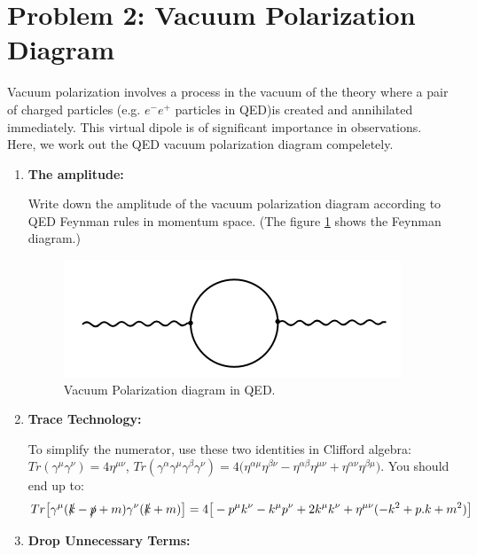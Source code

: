 \documentclass[11pt]{article}
\begin{document}
\newpage
	\section*{Problem 2: Vacuum Polarization Diagram}

\begin{problem}
	Vacuum polarization involves a process in the vacuum of the theory where a pair of charged particles (e.g. $e^-e^+$ particles in QED)is created and annihilated  immediately. This virtual dipole is of significant importance in observations. Here, we work out the QED vacuum polarization diagram compeletely.
	\end{problem}

\begin{enumerate}
	\item
	\begin{problem}{\points{-}}
		\textbf{The amplitude:}
		
		Write down the amplitude of the vacuum polarization diagram according to QED‌ Feynman rules in momentum space. (The figure \ref{vaccpoldiag} shows the Feynman diagram.)
		\begin{figure}[H]
			\centering
			\includegraphics[width=0.35\linewidth]{img/2.png}
			\caption{Vacuum Polarization diagram in QED.}
			\label{vaccpoldiag}
		\end{figure}

	\end{problem}
\item
\begin{problem}{\points{-}}
	\textbf{Trace Technology:}
	
	To simplify the numerator, use these two identities in Clifford algebra:
	$Tr(\gamma^\mu\gamma^\nu) = 4\eta^{\mu\nu}$,
	$Tr(\gamma^\alpha\gamma^\mu\gamma^\beta\gamma^\nu) = 4\big(
	\eta^{\alpha\mu}\eta^{\beta\nu}-\eta^{\alpha\beta}\eta^{\mu\nu}+\eta^{\alpha\nu}\eta^{\beta\mu}
	\big)$. You should end up to:
	\[
	Tr\big[
	\gamma^\mu (\slashed{k}-\slashed{p}+m)\gamma^\nu (\slashed{k}+m)
	\big]=
	4\big[
	-p^\mu k^\nu - k^\mu p^\nu + 2k^\mu k^\nu + \eta^{\mu\nu} (-k^2 +p.k+m^2)
	\big]
	\]
	
\end{problem}
\item
\begin{problem}{\points{-}}
	\textbf{Drop Unnecessary Terms:}
	

\end{problem}
\end{enumerate}
\end{document}
